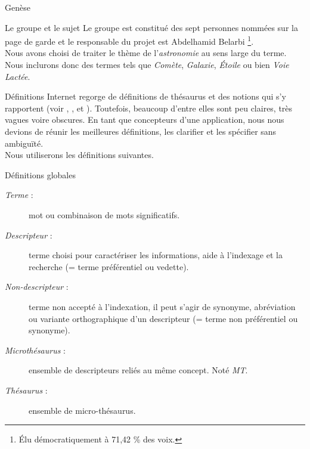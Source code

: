 \documentclass[a4paper, 12pt]{report}
\begin{document}
\begin{chapter}{Genèse}
	\begin{section}{Le groupe et le sujet}
		Le groupe est constitué des sept personnes nommées sur la page de garde et le responsable du projet est Abdelhamid Belarbi
		\footnote{Élu démocratiquement à 71,42 \% des voix.}.\\
		Nous avons choisi de traiter le thème de l’\emph{astronomie} au sens large du terme. Nous inclurons donc des termes tels que \emph{Comète},
		\emph{Galaxie}, \emph{Étoile} ou bien \emph{Voie Lactée}.
	\end{section}
	
	\begin{section}{Définitions}\label{aspic}
		Internet regorge de définitions de thésaurus et des notions qui s’y rapportent (voir \cite{Wikipedia}, \cite{Inpes}, \cite{Bdsp} et \cite{Unesco}).
		Toutefois, beaucoup d’entre elles sont peu claires, très vagues voire obscures. En tant que concepteurs d’une application, nous nous devions de réunir les
		meilleures définitions, les clarifier et les spécifier sans ambiguïté.\\
		
		
		
		\noindent
		Nous utiliserons les définitions suivantes.
		\begin{subsection}{Définitions globales}
			\begin{description}
				\item[\emph{Terme} :] mot ou combinaison de mots significatifs.
				\item[\emph{Descripteur} :] terme choisi pour caractériser les informations, aide à l'indexage et la recherche (= terme préférentiel ou vedette).
				\item[\emph{Non-descripteur} :] terme non accepté à l'indexation, il peut s'agir de synonyme, abréviation ou variante orthographique d'un descripteur
				(= terme non préférentiel ou
				synonyme).
				\item[\emph{Microthésaurus} :] ensemble de descripteurs reliés au même concept. Noté \emph{MT}.
				\item[\emph{Thésaurus} :] ensemble de micro-thésaurus.
			\end{description}
		\end{subsection}
		

\end{section}
\end{chapter}
\end{document}
